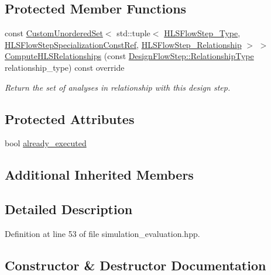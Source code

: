 \subsection*{Protected Member Functions}
\begin{DoxyCompactItemize}
\item 
const \hyperlink{classCustomUnorderedSet}{Custom\+Unordered\+Set}$<$ std\+::tuple$<$ \hyperlink{hls__step_8hpp_ada16bc22905016180e26fc7e39537f8d}{H\+L\+S\+Flow\+Step\+\_\+\+Type}, \hyperlink{hls__step_8hpp_a5fdd2edf290c196531d21d68e13f0e74}{H\+L\+S\+Flow\+Step\+Specialization\+Const\+Ref}, \hyperlink{hls__step_8hpp_a3ad360b9b11e6bf0683d5562a0ceb169}{H\+L\+S\+Flow\+Step\+\_\+\+Relationship} $>$ $>$ \hyperlink{classSimulationEvaluation_ac8dec0177f09c24785ddb353194efe83}{Compute\+H\+L\+S\+Relationships} (const \hyperlink{classDesignFlowStep_a723a3baf19ff2ceb77bc13e099d0b1b7}{Design\+Flow\+Step\+::\+Relationship\+Type} relationship\+\_\+type) const override
\begin{DoxyCompactList}\small\item\em Return the set of analyses in relationship with this design step. \end{DoxyCompactList}\end{DoxyCompactItemize}
\subsection*{Protected Attributes}
\begin{DoxyCompactItemize}
\item 
bool \hyperlink{classSimulationEvaluation_a4d3bf56963b28bb3aa34a286034a9791}{already\+\_\+executed}
\end{DoxyCompactItemize}
\subsection*{Additional Inherited Members}


\subsection{Detailed Description}


Definition at line 53 of file simulation\+\_\+evaluation.\+hpp.



\subsection{Constructor \& Destructor Documentation}
\mbox{\label{classSimulationEvaluation_a9a6181408bb5dc0db7490adb3bb75efd}} 
